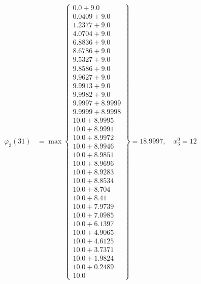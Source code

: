 \documentclass{article}
\begin{document}
\begin{align*}
\varphi_{3}(31) &= \max \left\{ \begin{array}{c}
0.0 + 9.0 \\
 0.0409 + 9.0 \\
 1.2377 + 9.0 \\
 4.0704 + 9.0 \\
 6.8836 + 9.0 \\
 8.6786 + 9.0 \\
 9.5327 + 9.0 \\
 9.8586 + 9.0 \\
 9.9627 + 9.0 \\
 9.9913 + 9.0 \\
 9.9982 + 9.0 \\
 9.9997 + 8.9999 \\
 9.9999 + 8.9998 \\
 10.0 + 8.9995 \\
 10.0 + 8.9991 \\
 10.0 + 8.9972 \\
 10.0 + 8.9946 \\
 10.0 + 8.9851 \\
 10.0 + 8.9696 \\
 10.0 + 8.9283 \\
 10.0 + 8.8534 \\
 10.0 + 8.704 \\
 10.0 + 8.41 \\
 10.0 + 7.9739 \\
 10.0 + 7.0985 \\
 10.0 + 6.1397 \\
 10.0 + 4.9065 \\
 10.0 + 4.6125 \\
 10.0 + 3.7371 \\
 10.0 + 1.9824 \\
 10.0 + 0.2489 \\
 10.0
\end{array} \right\}=18.9997, \quad x_{3}^0=12\\
  

\end{align*}
\end{document}
